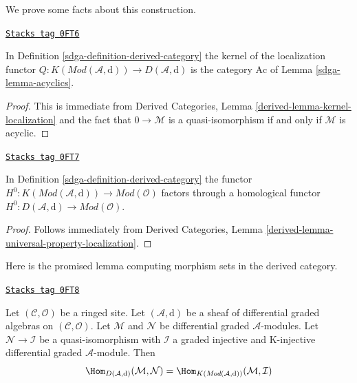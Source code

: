 We prove some facts about this construction.

\begin{lemma}
\label{sdga-lemma-kernel-localization}
\href{https://stacks.math.columbia.edu/tag/0FT6}{\texttt{Stacks tag 0FT6}}

In Definition \ref{sdga-definition-derived-category}
the kernel of the localization functor
$Q : K(\textit{Mod}(\mathcal{A}, \text{d})) \to D(\mathcal{A}, \text{d})$
is the category $\text{Ac}$ of Lemma \ref{sdga-lemma-acyclics}.
\end{lemma}

\begin{proof}
This is immediate from
Derived Categories, Lemma \ref{derived-lemma-kernel-localization}
and the fact that $0 \to \mathcal{M}$ is a quasi-isomorphism
if and only if $\mathcal{M}$ is acyclic.
\end{proof}

\begin{lemma}[H0 over D]
\label{sdga-lemma-H0-over-D}
\href{https://stacks.math.columbia.edu/tag/0FT7}{\texttt{Stacks tag 0FT7}}

In Definition \ref{sdga-definition-derived-category} the functor
$H^0 : K(\textit{Mod}(\mathcal{A}, \text{d})) \to
\textit{Mod}(\mathcal{O})$ factors through a homological functor
$H^0 : D(\mathcal{A}, \text{d}) \to \textit{Mod}(\mathcal{O})$.
\end{lemma}

\begin{proof}
Follows immediately from
Derived Categories, Lemma \ref{derived-lemma-universal-property-localization}.
\end{proof}

Here is the promised lemma computing morphism sets in the
derived category.

\begin{lemma}
\label{sdga-lemma-hom-derived}
\href{https://stacks.math.columbia.edu/tag/0FT8}{\texttt{Stacks tag 0FT8}}

Let $(\mathcal{C}, \mathcal{O})$ be a ringed site. Let
$(\mathcal{A}, \text{d})$ be a sheaf of differential graded algebras
on $(\mathcal{C}, \mathcal{O})$.
Let $\mathcal{M}$ and $\mathcal{N}$ be differential graded
$\mathcal{A}$-modules. Let $\mathcal{N} \to \mathcal{I}$ be a
quasi-isomorphism with $\mathcal{I}$ a graded injective and
K-injective differential graded $\mathcal{A}$-module. Then
$$
\Hom_{D(\mathcal{A}, \text{d})}(\mathcal{M}, \mathcal{N}) =
\Hom_{K(\textit{Mod}(\mathcal{A}, \text{d}))}(\mathcal{M}, \mathcal{I})
$$
\end{lemma}

